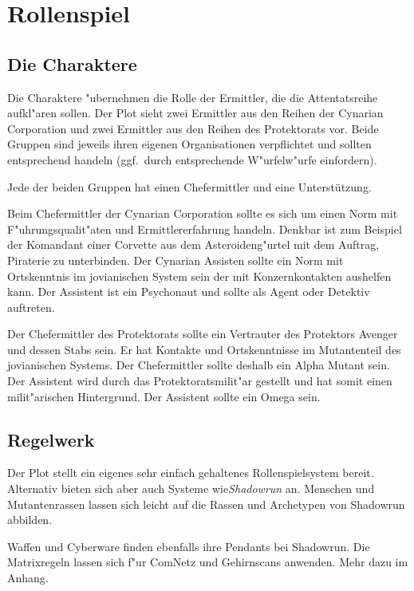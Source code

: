 \chapter{Rollenspiel}

\section{Die Charaktere}

Die Charaktere "ubernehmen die Rolle der Ermittler, die die Attentatsreihe aufkl"aren sollen. Der Plot sieht zwei Ermittler aus den Reihen der Cynarian Corporation und zwei Ermittler aus den Reihen des Protektorats vor. Beide Gruppen sind jeweils ihren eigenen Organisationen verpflichtet und sollten entsprechend handeln (ggf.~durch entsprechende W"urfelw"urfe einfordern).

Jede der beiden Gruppen hat einen Chefermittler und eine Unterstützung.

Beim Chefermittler der Cynarian Corporation sollte es sich um einen Norm  mit F"uhrungsqualit"aten und Ermittlererfahrung handeln. Denkbar ist zum Beispiel der Komandant einer Corvette aus dem Asteroideng"urtel mit dem Auftrag, Piraterie zu unterbinden. Der Cynarian Assisten sollte ein Norm mit Ortskenntnis im jovianischen System sein der mit Konzernkontakten aushelfen kann. Der Assistent ist ein Psychonaut und sollte als Agent oder Detektiv auftreten.

Der Chefermittler des Protektorats sollte ein Vertrauter des Protektors Avenger und dessen Stabs sein. Er hat Kontakte und Ortskenntnisse im Mutantenteil des jovianischen Systems. Der Chefermittler sollte deshalb ein Alpha Mutant sein. Der Assistent wird durch das Protektoratsmilit"ar gestellt und hat somit einen milit"arischen Hintergrund. Der Assistent sollte ein Omega sein.

\section{Regelwerk}

Der Plot stellt ein eigenes sehr einfach gehaltenes Rollenspielsystem bereit. Alternativ bieten sich aber auch Systeme wie\emph{Shadowrun} an. Menschen und Mutantenrassen lassen sich leicht auf die Rassen und Archetypen von Shadowrun abbilden. 

Waffen und Cyberware finden ebenfalls ihre Pendants bei Shadowrun. Die Matrixregeln lassen sich f"ur ComNetz und Gehirnscans anwenden. Mehr dazu im Anhang.